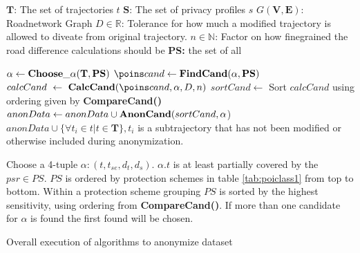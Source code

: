 \begin{algorithm}%
\dontprintsemicolon
\SetVline


\Input
{

	$\mathbf{T}$: The set of trajectories $t$ \;
	$\mathbf{S}$: The set of privacy profiles $s$\;
	$G(\mathbf{V,E})$: Roadnetwork Graph \;
	$D \in \mathbb{R}$: Tolerance for how much a modified trajectory is allowed to diveate from original trajectory. \;
	$n \in \mathbb{N}$: Factor on how finegrained the road difference calculations should be \;
	{\bf PS:} the set of all \poisns \;
}

{
	$\alpha \leftarrow {\bf Choose\_\alpha(\mathbf{T}, PS)}$ \;
	${\poins}cand \leftarrow {\bf FindCand(\alpha, PS)}$ \;
	$calcCand~\leftarrow~{\bf CalcCand}({\poins}cand, \alpha, D, n)$ \;
	$sortCand \leftarrow$  Sort $calcCand$ using ordering given by {\bf CompareCand()} \;
	$anonData \leftarrow anonData \cup {\bf AnonCand}(sortCand, \alpha$) \;
}
\(anonData \cup \{\forall t_i  \in t  | t \in \mathbf{T}\}, t_i \) is a subtrajectory that has not been modified or otherwise included during anonymization.

{
	Choose a 4-tuple $\alpha: (t, t_{se}, d_{t}, d_{s})$. $\alpha.t$ is at least partially covered by the \poi $psr \in PS$. $PS$ is ordered by protection schemes in table \ref{tab:poiclass1} from top to bottom. Within a protection scheme grouping $PS$ is sorted by the highest sensitivity, using ordering from {\bf CompareCand()}. If more than one candidate for $\alpha$ is found the first found will be chosen. \; 

	\Return{$\alpha$}
}

\caption{Overall execution of algorithms to anonymize dataset}
\label{alg:overall}
\end{algorithm}